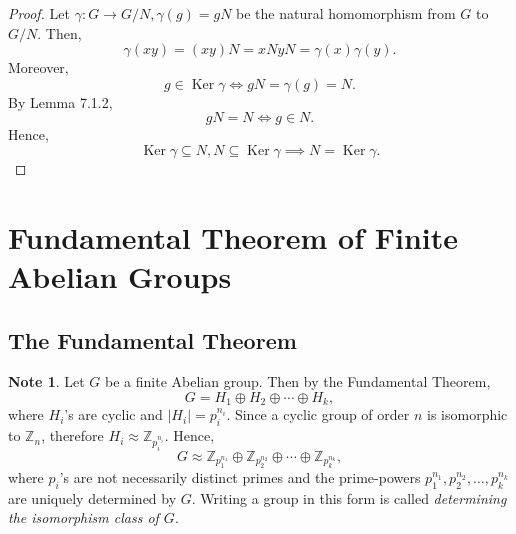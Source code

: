 \documentclass{article}
\newtheorem{theorem}{Theorem}[section]
\theoremstyle{definition}
\newtheorem{note}{Note}[section]
\DeclareMathOperator{\Ker}{Ker}
\begin{document}
    \begin{proof}
       Let $\gamma:G\to G/N, \gamma(g)=gN$ be the natural homomorphism from $G$ to $G/N$. Then,
       \begin{equation*}
           \gamma(xy)=(xy)N=xNyN=\gamma(x)\gamma(y).
       \end{equation*}
       Moreover,
       \begin{equation*}
           g\in\Ker\gamma\iff gN=\gamma(g)=N.
       \end{equation*}
       By Lemma 7.1.2,
       \begin{equation*}
           gN=N\iff g\in N.
       \end{equation*}
       Hence,
       \begin{equation*}
           \Ker\gamma\subseteq N, N\subseteq\Ker\gamma \implies N=\Ker\gamma.
       \end{equation*}
    \end{proof}
    
    \section{Fundamental Theorem of Finite Abelian Groups}
    \subsection{The Fundamental Theorem}
    
    \begin{note}
        Let $G$ be a finite Abelian group. Then by the Fundamental Theorem,
        \begin{equation*}
            G = H_1 \oplus H_2 \oplus \cdots \oplus H_k,
        \end{equation*}
        where $H_i$'s are cyclic and $|H_i|=p_i^{n_i}$. Since a cyclic group of order $n$ is isomorphic to $\mathbb{Z}_n$, therefore $H_i \approx \mathbb{Z}_{p_i^{n_i}}$. Hence,
       \begin{equation*}
           G \approx \mathbb{Z}_{p_1^{n_1}} \oplus \mathbb{Z}_{p_2^{n_2}} \oplus \cdots \oplus \mathbb{Z}_{p_k^{n_k}},
       \end{equation*}
       where $p_i$'s are not necessarily distinct primes and the prime-powers $p_1^{n_1},p_2^{n_2},\dots,p_k^{n_k}$ are uniquely determined by $G$. Writing a group in this form is called \textit{determining the isomorphism class of $G$}.
    \end{note}
    
\end{document}

